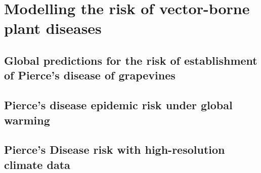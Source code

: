 \documentclass[
	10pt, %
	a4paper, %
]{LegrandOrangeBook}
\begin{document}
 {
  \hypersetup{hidelinks}
  \part{Modelling the risk of vector-borne plant diseases}
 }
%

\chapterspaceabove{6.75cm}
\chapterspacebelow{7.25cm}

\chapter{Global predictions for the risk of establishment of Pierce’s disease
  of grapevines}\label{ch:commsbio}
%

\chapterspaceabove{6.75cm}
\chapterspacebelow{7.25cm}

\chapter{Pierce's disease epidemic risk under global warming}

\chapterspaceabove{6.75cm}
\chapterspacebelow{7.25cm}

\chapter{Pierce's Disease risk with high-resolution climate data}
\end{document}

